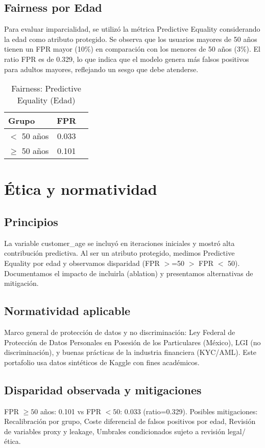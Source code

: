 \documentclass[runningheads]{llncs}
\begin{document}
\subsection{Fairness por Edad}
Para evaluar imparcialidad, se utilizó la métrica Predictive Equality considerando la edad como atributo protegido. 
Se observa que los usuarios mayores de 50 años tienen un FPR mayor (10\%) en comparación con los menores de 50 años (3\%). 
El ratio FPR es de 0.329, lo que indica que el modelo genera más falsos positivos para adultos mayores, reflejando un sesgo que debe atenderse.

\begin{table}[!ht]
\centering
\caption{Fairness: Predictive Equality (Edad)}
\label{tab:fairness}
\begin{tabular}{lcc}
\toprule
Grupo & FPR \\
\midrule
$<$ 50 años & 0.033 \\
$\geq$ 50 años & 0.101 \\
\bottomrule
\end{tabular}
\end{table}


\section{Ética y normatividad}
\subsection{Principios}
La variable customer\_age se incluyó en iteraciones iniciales y mostró alta contribución predictiva. 
Al ser un atributo protegido, medimos Predictive Equality por edad y observamos disparidad (FPR $>$=50 $>$ FPR $<$ 50).
Documentamos el impacto de incluirla (ablation) y presentamos alternativas de mitigación.

\subsection{Normatividad aplicable}
Marco general de protección de datos y no discriminación:
Ley Federal de Protección de Datos Personales en Posesión de los Particulares (México),
LGI (no discriminación),
y buenas prácticas de la industria financiera (KYC/AML). 
Este portafolio usa datos sintéticos de Kaggle con fines académicos.

\subsection{Disparidad observada y mitigaciones}
FPR $\geq 50$ años: 0.101 vs FPR $<50$: 0.033 (ratio=0.329). 
Posibles mitigaciones: 
Recalibración por grupo,
Coste diferencial de falsos positivos por edad,
Revisión de variables proxy y leakage,
Umbrales condicionados sujeto a revisión legal/ética.
\end{document}
